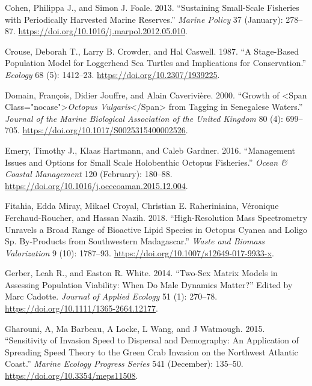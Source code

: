 \documentclass[
]{article}
\newlength{\cslhangindent}
\newlength{\cslentryspacingunit} %
\newenvironment{CSLReferences}[2] %
 {%
  \setlength{\parindent}{0pt}
  \ifodd #1
  \let\oldpar\par
  \def\par{\hangindent=\cslhangindent\oldpar}
  \fi
  \setlength{\parskip}{#2\cslentryspacingunit}
 }%
 {}
\begin{document}
\begin{CSLReferences}{1}{0}
\leavevmode{}%
Cohen, Philippa J., and Simon J. Foale. 2013. {``Sustaining Small-Scale Fisheries with Periodically Harvested Marine Reserves.''} \emph{Marine Policy} 37 (January): 278--87. \url{https://doi.org/10.1016/j.marpol.2012.05.010}.

\leavevmode{}%
Crouse, Deborah T., Larry B. Crowder, and Hal Caswell. 1987. {``A {Stage}-{Based} {Population} {Model} for {Loggerhead} {Sea} {Turtles} and {Implications} for {Conservation}.''} \emph{Ecology} 68 (5): 1412--23. \url{https://doi.org/10.2307/1939225}.

\leavevmode{}%
Domain, François, Didier Jouffre, and Alain Caverivière. 2000. {``Growth of {\textless{}}Span Class="nocase"{\textgreater{}}\emph{{Octopus} Vulgaris}{\textless{}}/Span{\textgreater{}} from Tagging in {Senegalese} Waters.''} \emph{Journal of the Marine Biological Association of the United Kingdom} 80 (4): 699--705. \url{https://doi.org/10.1017/S0025315400002526}.

\leavevmode{}%
Emery, Timothy J., Klaas Hartmann, and Caleb Gardner. 2016. {``Management Issues and Options for Small Scale Holobenthic Octopus Fisheries.''} \emph{Ocean \& Coastal Management} 120 (February): 180--88. \url{https://doi.org/10.1016/j.ocecoaman.2015.12.004}.

\leavevmode{}%
Fitahia, Edda Miray, Mikael Croyal, Christian E. Raheriniaina, Véronique Ferchaud-Roucher, and Hassan Nazih. 2018. {``High-{Resolution} {Mass} {Spectrometry} {Unravels} a {Broad} {Range} of {Bioactive} {Lipid} {Species} in {Octopus} Cyanea and {Loligo} Sp. {By}-Products from {Southwestern} {Madagascar}.''} \emph{Waste and Biomass Valorization} 9 (10): 1787--93. \url{https://doi.org/10.1007/s12649-017-9933-x}.

\leavevmode{}%
Gerber, Leah R., and Easton R. White. 2014. {``Two-Sex Matrix Models in Assessing Population Viability: When Do Male Dynamics Matter?''} Edited by Marc Cadotte. \emph{Journal of Applied Ecology} 51 (1): 270--78. \url{https://doi.org/10.1111/1365-2664.12177}.

\leavevmode{}%
Gharouni, A, Ma Barbeau, A Locke, L Wang, and J Watmough. 2015. {``Sensitivity of Invasion Speed to Dispersal and Demography: An Application of Spreading Speed Theory to the Green Crab Invasion on the Northwest {Atlantic} Coast.''} \emph{Marine Ecology Progress Series} 541 (December): 135--50. \url{https://doi.org/10.3354/meps11508}.


\end{CSLReferences}
\end{document}
